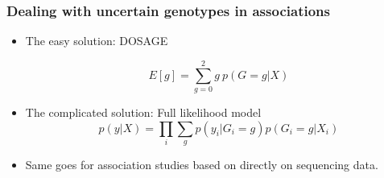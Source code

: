 \documentclass[xcolor=pdftex,dvipsnames,table,10pt]{beamer}
\begin{document}
\begin{frame}
  \frametitle{Dealing with uncertain genotypes in associations}
\begin{itemize}
\item The easy solution: DOSAGE

 $$E[g] = \sum_{g=0}^{2}g\ p(G=g | X)$$

\item The complicated solution: Full likelihood model
$$p(y | X) = \prod_{i} \sum_{g} p(y_i | G_i =g)p(G_i = g | X_i)$$

\item Same goes for association studies based on directly on sequencing data.
\end{itemize}
\end{frame}
\end{document}
